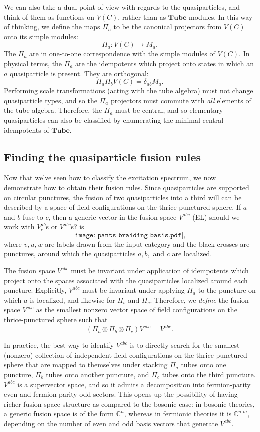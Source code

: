 \documentclass[12pt,a4paper]{article}
\newcounter{arrow}
\newcommand{\tp}{\otimes}
\newcommand{\cc}{\mathbb{C}}
\newcommand\be            {\begin{equation}}
\newcommand\ee            {\end{equation}}
\newcommand{\tube}{\textbf{Tube}}
\newcommand{\ethan}[1]{{\color{amethyst}\footnotesize{(EL) #1}}}
\begin{document}
We can also take a dual point of view with regards to the quasiparticles, and think of them as functions on $V(C)$, rather than as $\tube$-modules. In this way of thinking, we define the maps $\Pi_a$ to be the canonical projectors from $V(C)$ onto its simple modules:
\be \Pi_a : V(C) \rightarrow M_a.\ee
The $\Pi_a$ are in one-to-one correspondence with the simple modules of $V(C)$. In physical terms, the $\Pi_a$ are the idempotents which project onto states in which an $a$ quasiparticle is present. They are orthogonal:
\be \Pi_a \Pi_b V(C) = \delta_{ab}M_a.\ee
Performing scale transformations (acting with the tube algebra) must not change quasiparticle types, and so the $\Pi_a$ projectors must commute with {\it all} elements of the tube algebra. Therefore, the $\Pi_a$ must be central, and so elementary quasiparticles can also be classified by enumerating the minimal central idempotents of $\tube$. 


\subsection{Finding the quasiparticle fusion rules}

Now that we've seen how to classify the excitation spectrum, we now demonstrate how to obtain their fusion rules. Since quasiparticles are supported on circular punctures, the fusion of two quasiparticles into a third will can be described by a space of field configurations on the thrice-punctured sphere. If $a$ and $b$ fuse to $c$, then a generic vector in the fusion space $V^{abc}$ \ethan{should we work with $V^{ab}_c$s or $V^{abc}$s?} is 
\be \label{pants_braiding_basis} \texttt{[image: pants\_braiding\_basis.pdf]},\ee
where $v,u,w$ are labels drawn from the input category and the black crosses are punctures, around which the quasiparticles $a,b,$ and $c$ are localized. 

The fusion space $V^{abc}$ must be invariant under application of idempotents which project onto the spaces associated with the quasiparticles localized around each puncture. Explicitly, $V^{abc}$ must be invariant under applying $\Pi_a$ to the puncture on which $a$ is localized, and likewise for $\Pi_b$ and $\Pi_c$. 
Therefore, we {\it define} the fusion space $V^{abc}$ as the smallest nonzero vector space of field configurations on the thrice-punctured sphere such that 
\be (\Pi_a\tp \Pi_b \tp \Pi_c) V^{abc} = V^{abc}.\ee

In practice, the best way to identify $V^{abc}$ is to directly search for the smallest (nonzero) collection of independent field configurations on the thrice-punctured sphere that are mapped to themselves under stacking $\Pi_a$ tubes onto one puncture, $\Pi_b$ tubes onto another puncture, and $\Pi_c$ tubes onto the third puncture. $V^{abc}$ is a supervector space, and so it admits a decomposition into fermion-parity even and fermion-parity odd sectors. This opens up the possibility of having richer fusion space structure as compared to the bosonic case: in bosonic theories, a generic fusion space is of the form $\cc^n$, whereas in fermionic theories it is $\cc^{n|m}$, depending on the number of even and odd basis vectors that generate $V^{abc}$.
\end{document}
